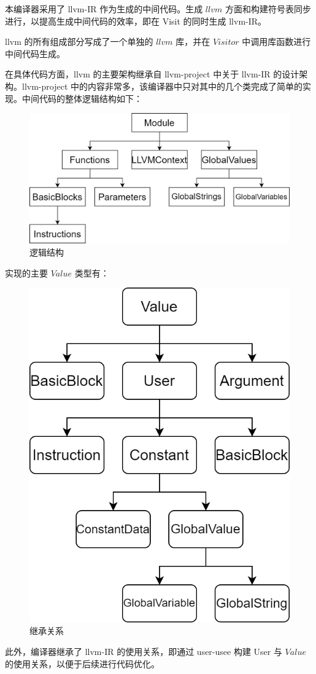 \documentclass[a4paper]{article}
\begin{document}
		本编译器采用了 llvm-IR 作为生成的中间代码。生成 $llvm$ 方面和构建符号表同步进行，以提高生成中间代码的效率，即在 Visit 的同时生成 llvm-IR。
		
		llvm 的所有组成部分写成了一个单独的 $llvm$ 库，并在 $Visitor$ 中调用库函数进行中间代码生成。
		
		在具体代码方面，llvm 的主要架构继承自 llvm-project 中关于 llvm-IR 的设计架构。llvm-project 中的内容非常多，该编译器中只对其中的几个类完成了简单的实现。中间代码的整体逻辑结构如下：
		
		\begin{figure}[H]
		 	\centering
		 	\includegraphics[width=0.7\linewidth]{images/structure.png}
		 	\caption{逻辑结构}
		 	\label{fig:label6}	
		\end{figure}
		
		实现的主要 $Value$ 类型有：
		
		\begin{figure}[H]
			\centering
			\includegraphics[width=0.5\linewidth]{images/inheritate.png}
			\caption{继承关系}
			\label{fig:label5}	
		\end{figure}
				
		此外，编译器继承了 llvm-IR 的使用关系，即通过 user-usee 构建 User 与 $Value$ 的使用关系，以便于后续进行代码优化。
		
\end{document}
